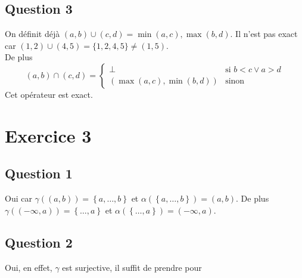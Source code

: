 \documentclass{cours}
\begin{document}
\subsection{Question 3}
On définit déjà $(a, b) \cup (c, d) = \min (a, c), \max(b, d)$. Il n'est pas exact car $(1, 2) \cup (4, 5) = \{1, 2, 4, 5\} \neq (1, 5)$.\\
De plus \[(a, b) \cap (c, d) = \begin{cases}
    \bot & \text{si } b < c \lor a > d\\
    (\max(a, c), \min(b, d)) & \text{sinon}
\end{cases}\]
Cet opérateur est exact.

\section{Exercice 3}
\subsection{Question 1}
Oui car $\gamma((a, b)) = \left\{a, \ldots, b\right\}$ et $\alpha(\left\{a, \ldots, b\right\}) = (a, b)$. De plus $\gamma((-\infty, a)) = \left\{\ldots, a\right\}$ et $\alpha(\left\{\ldots, a\right\}) = (-\infty, a)$.

\subsection{Question 2}
Oui, en effet, $\gamma$ est surjective, il suffit de prendre pour 
\end{document}
